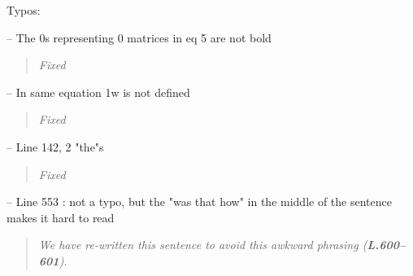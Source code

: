 \documentclass[11pt]{article}
\begin{document}
\noindent Typos:
\smallskip

\noindent-- The 0s representing 0 matrices in eq 5 are not bold
\begin{quote}
	{\itshape Fixed}
\end{quote}

\noindent-- In same equation 1w is not defined
\begin{quote}
	{\itshape Fixed}
\end{quote}

\noindent-- Line 142, 2 "the"s
\begin{quote}
	{\itshape Fixed}
\end{quote}

\noindent-- Line 553 : not a typo, but the "was that how" in the middle of the sentence makes it hard to read
\begin{quote}
	{\itshape We have re-written this sentence to avoid this awkward phrasing ({\bf L.600--601}).}
\end{quote}
\end{document}
